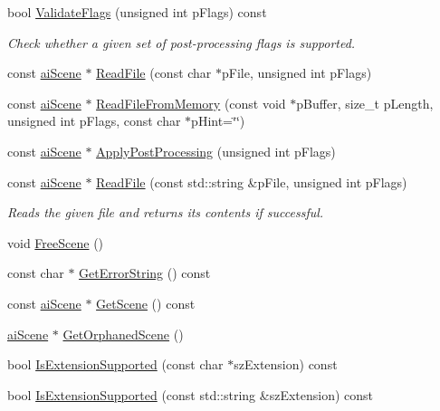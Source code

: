 \begin{CompactItemize}
bool \hyperlink{class_assimp_1_1_importer_780329e2dd0406e930291cf8ab9deb99}{ValidateFlags} (unsigned int pFlags) const 
\begin{CompactList}\small\item\em Check whether a given set of post-processing flags is supported. \item\end{CompactList}\item 
const \hyperlink{structai_scene}{aiScene} $\ast$ \hyperlink{class_assimp_1_1_importer_174418ab41d5b8bc51a044895cb991e5}{ReadFile} (const char $\ast$pFile, unsigned int pFlags)
\item 
const \hyperlink{structai_scene}{aiScene} $\ast$ \hyperlink{class_assimp_1_1_importer_9b3c5e8b1042702f449e84a95b3324f6}{ReadFileFromMemory} (const void $\ast$pBuffer, size\_\-t pLength, unsigned int pFlags, const char $\ast$pHint=\char`\"{}\char`\"{})
\item 
const \hyperlink{structai_scene}{aiScene} $\ast$ \hyperlink{class_assimp_1_1_importer_5872e749c1451fee64183fc14f1fc81d}{ApplyPostProcessing} (unsigned int pFlags)
\item 
const \hyperlink{structai_scene}{aiScene} $\ast$ \hyperlink{class_assimp_1_1_importer_339882c7acb47d5b5110bbd078d870a9}{ReadFile} (const std::string \&pFile, unsigned int pFlags)
\begin{CompactList}\small\item\em Reads the given file and returns its contents if successful. \item\end{CompactList}\item 
void \hyperlink{class_assimp_1_1_importer_53dafc3046abc33365a07c605716c5d4}{FreeScene} ()
\item 
const char $\ast$ \hyperlink{class_assimp_1_1_importer_23bab5ba8cb9b6886c690a610766668b}{GetErrorString} () const 
\item 
const \hyperlink{structai_scene}{aiScene} $\ast$ \hyperlink{class_assimp_1_1_importer_26fd479a6a955969c1377fa59f92db66}{GetScene} () const 
\item 
\hyperlink{structai_scene}{aiScene} $\ast$ \hyperlink{class_assimp_1_1_importer_60eb9042fb85bfbd61a863e131a56ecd}{GetOrphanedScene} ()
\item 
bool \hyperlink{class_assimp_1_1_importer_9146ea75c33c0aac0310195346877388}{IsExtensionSupported} (const char $\ast$szExtension) const 
\item 
bool \hyperlink{class_assimp_1_1_importer_5b01905366f5bf8d1f89d51f755bf7d2}{IsExtensionSupported} (const std::string \&szExtension) const 

\end{CompactItemize}
